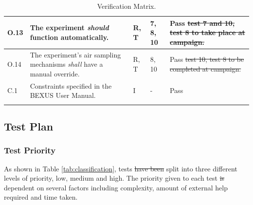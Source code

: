 \documentclass[a4paper,12pt,oneside]{article}
\providecommand{\DIFaddtex}[1]{{\protect\color{blue}\uwave{#1}}} %
\providecommand{\DIFdeltex}[1]{{\protect\color{red}\sout{#1}}}                      %
\providecommand{\DIFaddbegin}{} %
\providecommand{\DIFaddend}{} %
\providecommand{\DIFdelbegin}{} %
\providecommand{\DIFdelend}{} %
\providecommand{\DIFadd}[1]{\texorpdfstring{\DIFaddtex{#1}}{#1}} %
\providecommand{\DIFdel}[1]{\texorpdfstring{\DIFdeltex{#1}}{}} %
\newcommand{\DIFscaledelfig}{0.5}
\newlength{\DIFdelgraphicswidth} %
\newlength{\DIFdelgraphicsheight} %
\newcommand{\DIFaddincludegraphics}[2][]{{\color{blue}\fbox{\DIFOincludegraphics[#1]{#2}}}} %
\newcommand{\DIFdelincludegraphics}[2][]{%
\sbox{\DIFdelgraphicsbox}{\DIFOincludegraphics[#1]{#2}}%
\settoboxwidth{\DIFdelgraphicswidth}{\DIFdelgraphicsbox} %
\settoboxtotalheight{\DIFdelgraphicsheight}{\DIFdelgraphicsbox} %
\scalebox{\DIFscaledelfig}{%
\parbox[b]{\DIFdelgraphicswidth}{\usebox{\DIFdelgraphicsbox}\\[-\baselineskip] \rule{\DIFdelgraphicswidth}{0em}}\llap{\resizebox{\DIFdelgraphicswidth}{\DIFdelgraphicsheight}{%
\setlength{\unitlength}{\DIFdelgraphicswidth}%
\begin{picture}(1,1)%
\thicklines\linethickness{2pt} %
{\color[rgb]{1,0,0}\put(0,0){\framebox(1,1){}}}%
{\color[rgb]{1,0,0}\put(0,0){\line( 1,1){1}}}%
{\color[rgb]{1,0,0}\put(0,1){\line(1,-1){1}}}%
\end{picture}%
}\hspace*{3pt}}} %
} %
\DeclareRobustCommand{\DIFaddbegin}{\DIFOaddbegin \let\includegraphics\DIFaddincludegraphics} %
\DeclareRobustCommand{\DIFaddend}{\DIFOaddend \let\includegraphics\DIFOincludegraphics} %
\DeclareRobustCommand{\DIFdelbegin}{\DIFOdelbegin \let\includegraphics\DIFdelincludegraphics} %
\DeclareRobustCommand{\DIFdelend}{\DIFOaddend \let\includegraphics\DIFOincludegraphics} %
\begin{document}
\begin{longtable}[]{|m{}| m{} |m{} |m{}|m{}|}
O.13 & The experiment \textit{should} function automatically.                                                           &      R, T        & 7, 8, 10            &    Pass     \DIFdelbegin \DIFdel{test 7 and 10, test 8 to take place at campaign.    }\DIFdelend \\ \hline %
O.14 & The experiment's air sampling mechanisms \textit{shall} have a manual override.                                                           &      R, T        & 8, 10            &    Pass   \DIFdelbegin \DIFdel{test 10, test 8 to be completed at campaign.    }\DIFdelend \\ \hline %
C.1  & Constraints specified in the BEXUS User Manual.                                                                                                                          &       I       & -            & Pass     \\ \hline

\caption{Verification Matrix.}
\label{tab:var-mat}
\end{longtable}
\raggedbottom

\pagebreak
\subsection{Test Plan}

\subsubsection{Test Priority} \label{sec:5.2.1-testpriority}
As shown in Table \ref{tab:classification}, tests \DIFdelbegin \DIFdel{have been }\DIFdelend \DIFaddbegin \DIFadd{were }\DIFaddend split into three different levels of priority, low, medium and high. The priority given to each test \DIFdelbegin \DIFdel{is }\DIFdelend \DIFaddbegin \DIFadd{was }\DIFaddend dependent on several factors including complexity, amount of external help required and time taken. 
\end{document}
